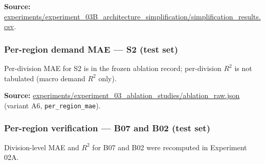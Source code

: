 \textbf{Source:} \url{experiments/experiment_03B_architecture_simplification/simplification_results.csv}.

\subsubsection{Per-region demand MAE --- S2 (test set)}\label{subsubsection:per_region_demand_mae_s2_test_set}

Per-division MAE for S2 is in the frozen ablation record; per-division $R^2$ is not tabulated (macro demand $R^2$ only).

\begin{center}
\scriptsize
{}
\end{center}

\textbf{Source:} \url{experiments/experiment_03_ablation_studies/ablation_raw.json} (variant A6, \texttt{per\_region\_mae}).

\subsubsection{Per-region verification --- B07 and B02 (test set)}\label{subsubsection:per_region_verification_b07_and_b02_test_set}

Division-level MAE and $R^2$ for B07 and B02 were recomputed in Experiment 02A.

\begin{center}
\scriptsize
{}
\end{center}

